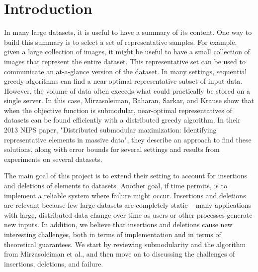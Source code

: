 \section{Introduction}

In many large datasets, it is useful to have a summary of its content. One way to build this summary is to select a set of representative samples. For example, given a large collection of images, it might be useful to have a small collection of images that represent the entire dataset. This representative set can be used to communicate an at-a-glance version of the dataset. In many settings, sequential greedy algorithms can find a near-optimal representative subset of input data. However, the volume of data often exceeds what could practically be stored on a single server. In this case, Mirzasoleiman, Baharan, Sarkar, and Krause show that when the objective function is submodular, near-optimal representatives of datasets can be found efficiently with a distributed greedy algorithm. In their 2013 NIPS paper, "Distributed submodular maximization: Identifying representative elements in massive data", they describe an approach to find these solutions, along with error bounds for several settings and results from experiments on several datasets.

	The main goal of this project is to extend their setting to account for insertions and deletions of elements to datasets. Another goal, if time permits, is to implement a reliable system where failure might occur. Insertions and deletions are relevant because few large datasets are completely static -- many applications with large, distributed data change over time as users or other processes generate new inputs. In addition, we believe that insertions and deletions cause new interesting challenges, both in terms of implementation and in terms of theoretical guarantees. We start by reviewing submodularity and the algorithm from Mirzasoleiman et al., and then move on to discussing the challenges of insertions, deletions, and failure.
